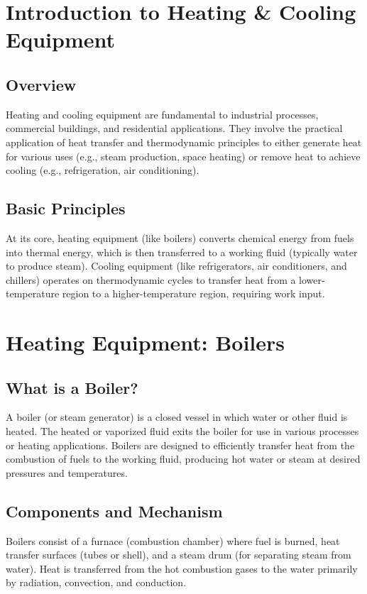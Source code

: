 \section{Introduction to Heating \& Cooling Equipment}

\subsection{Overview}
Heating and cooling equipment are fundamental to industrial processes, commercial buildings, and residential applications. They involve the practical application of heat transfer and thermodynamic principles to either generate heat for various uses (e.g., steam production, space heating) or remove heat to achieve cooling (e.g., refrigeration, air conditioning).

\subsection{Basic Principles}
At its core, heating equipment (like boilers) converts chemical energy from fuels into thermal energy, which is then transferred to a working fluid (typically water to produce steam). Cooling equipment (like refrigerators, air conditioners, and chillers) operates on thermodynamic cycles to transfer heat from a lower-temperature region to a higher-temperature region, requiring work input.

\section{Heating Equipment: Boilers}

\subsection{What is a Boiler?}
A boiler (or steam generator) is a closed vessel in which water or other fluid is heated. The heated or vaporized fluid exits the boiler for use in various processes or heating applications. Boilers are designed to efficiently transfer heat from the combustion of fuels to the working fluid, producing hot water or steam at desired pressures and temperatures.

\subsection{Components and Mechanism}
Boilers consist of a furnace (combustion chamber) where fuel is burned, heat transfer surfaces (tubes or shell), and a steam drum (for separating steam from water). Heat is transferred from the hot combustion gases to the water primarily by radiation, convection, and conduction.


